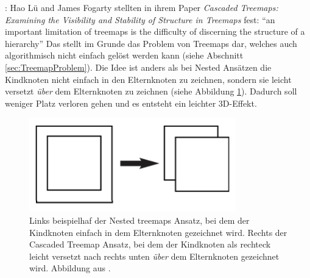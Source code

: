 \cite{lu2008cascaded}:
Hao Lü and James Fogarty stellten in ihrem Paper \textit{Cascaded Treemaps:
Examining the Visibility and Stability of Structure in Treemaps}\cite{lu2008cascaded} fest: \enquote{an important limitation of treemaps is
the difficulty of discerning the structure of a hierarchy}\cite[1]{lu2008cascaded} Das stellt im Grunde das Problem von Treemaps dar, welches auch algorithmisch nicht einfach gelöst werden kann (siehe Abschnitt \ref{sec:TreemapProblem}). Die Idee ist anders als bei Nested Ansätzen die Kindknoten nicht einfach in den Elternknoten zu zeichnen, sondern sie leicht versetzt \textit{über} dem Elternknoten zu zeichnen (siehe Abbildung \ref{fig:cascaded}). Dadurch soll weniger Platz verloren gehen und es entsteht ein leichter 3D-Effekt.

\begin{figure}
    \centering
    \includegraphics[width=0.8\textwidth]{images/cascaded.png}
    \caption{Links beispielhaf der Nested treemaps Ansatz, bei dem der Kindknoten einfach in dem Elternknoten gezeichnet wird. Rechts der Cascaded Treemap Ansatz, bei dem der Kindknoten als rechteck leicht versetzt nach rechts unten \textit{über} dem Elternknoten gezeichnet wird. Abbildung aus \cite[3]{lu2008cascaded}.}
    \label{fig:cascaded}
\end{figure}

